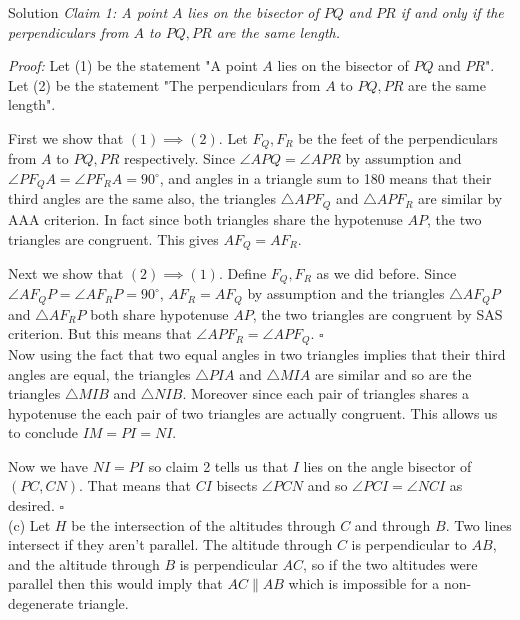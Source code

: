 \documentclass{article}
\begin{document}
\begin{solution}{Solution}
\textit{Claim 1: A point $A$ lies on the bisector of $PQ$ and $PR$ if and
only if the perpendiculars from $A$ to $PQ, PR$ are the same length.}
\vspace{0.2cm}

\textit{Proof:} Let (1) be the statement
"A point $A$ lies on the bisector of $PQ$ and $PR$".
Let (2) be the statement "The perpendiculars from $A$ to $PQ, PR$ are the
same length". \vspace{0.2cm}

First we show that $(1) \implies (2)$.
Let $F_Q, F_R$ be the feet of the perpendiculars from
$A$ to $PQ, PR$ respectively. Since $\angle APQ = \angle APR$ by assumption
and $\angle P F_Q A = \angle P F_R A = 90^\circ$, and angles in a triangle
sum
to 180 means that their third angles are the same also, the triangles
$\triangle APF_Q$ and $\triangle APF_R$ are similar by AAA criterion.
In fact since both triangles share the hypotenuse $AP$, the two triangles
are congruent. This gives $AF_Q = AF_R$.
\vspace{0.2cm}

Next we show that $(2) \implies (1)$. Define $F_Q, F_R$ as we did before.
Since $\angle A F_Q P = \angle A F_R P = 90^\circ$, $AF_R = AF_Q$ by
assumption and the triangles $\triangle AF_Q P$ and $\triangle AF_R P$
both share hypotenuse $AP$, the two triangles are congruent by SAS
criterion. But this means that $\angle APF_R = \angle APF_Q$. $\square$
\\

Now using the fact that two equal angles in two triangles implies that their
third angles are equal, the triangles $\triangle PIA$ and
$\triangle MIA$ are similar and so are the triangles
$\triangle MIB$ and $\triangle NIB$. Moreover since each pair of triangles
shares a hypotenuse the each pair of two triangles are actually congruent.
This allows us to conclude $IM = PI = NI$. \vspace{0.2cm}

Now we have $NI = PI$ so claim 2 tells us that $I$ lies on the angle
bisector of $(PC, CN)$. That means that $CI$ bisects $\angle PCN$ and
so $\angle PCI = \angle NCI$ as desired. $\square$
\\

(c) Let $H$ be the intersection of the altitudes through $C$ and through
$B$. Two lines intersect if they aren't parallel. The altitude
through $C$ is perpendicular to $AB$, and the altitude through $B$ is
perpendicular $AC$, so if the two altitudes were parallel then this would
imply that $AC \parallel AB$ which is impossible for a non-degenerate
triangle.
\vspace{0.2cm}


\end{solution}
\end{document}
